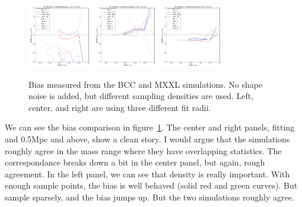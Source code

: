 \documentclass[11pt]{article}
\begin{document}
\begin{figure}
\includegraphics[width=0.25\textwidth]{figures/density_cfree-r1}
\includegraphics[width=0.25\textwidth]{figures/density_cfree-r5}
\includegraphics[width=0.25\textwidth]{figures/density_cfree-r10}
\caption{Bias measured from the BCC and MXXL simulations. No shape noise is added, but different sampling densities are used. Left, center, and right are using three different fit radii.}
\label{fig:bcc_vs_mxxl_density}
\end{figure}

We can see the bias comparison in figure~\ref{fig:bcc_vs_mxxl_density}. The center and right panels, fitting and 0.5Mpc and above, show a clean story. I would argue that the simulations roughly agree in the mass range where they have overlapping statistics. The correspondance breaks down a bit in the center panel, but again, rough agreement. In the left panel, we can see that density is really important. With enough sample points, the bias is well behaved (solid red and green curves). But sample sparsely, and the bias jumps up. But the two simulations roughly agree.
\end{document}
